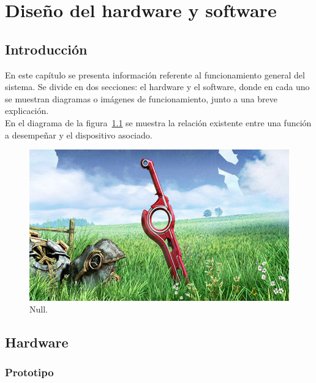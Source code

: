 
\chapter{Diseño del hardware y software}
\label{Chap:DisHard} %


\section{Introducción}

En este capítulo se presenta información referente al funcionamiento general del sistema. Se divide en dos secciones: el hardware y el software, donde en cada uno se muestran diagramas o imágenes de funcionamiento, junto a una breve explicación.\\

En el diagrama de la figura~\ref{fig:null1} se muestra la relación existente entre una función a desempeñar y el dispositivo asociado.

\begin{figure}[ht]
\centering
\includegraphics[scale=0.12]{Figures/null}
\caption[null.]{Null.\footnotemark}
\label{fig:null1}
\end{figure}


\section{Hardware}

\subsection{Prototipo}

